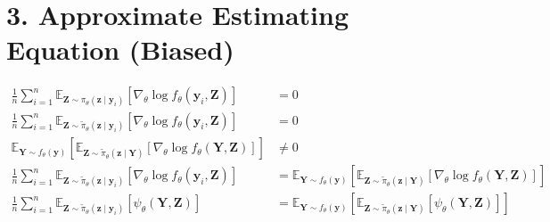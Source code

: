 \documentclass{article}
\begin{document}
\section*{3. Approximate Estimating Equation (Biased)}

\begin{align*}
\frac{1}{n} \sum_{i=1}^n 
\mathbb{E}_{\mathbf{Z} \sim \pi_\theta(\bm{z} \mid \bm{y}_i)} 
\left[
\nabla_\theta \log f_\theta(\bm{y}_i, \mathbf{Z})
\right] 
&= 0 \\
\frac{1}{n} \sum_{i=1}^n 
\mathbb{E}_{\mathbf{Z} \sim \tilde{\pi}_\theta(\bm{z} \mid \bm{y}_i)} 
\left[
\nabla_\theta \log f_\theta(\bm{y}_i, \mathbf{Z})
\right] 
&= 0 \\
\mathbb{E}_{\mathbf{Y} \sim f_\theta(\bm{y})}
\left[
\mathbb{E}_{\mathbf{Z} \sim \tilde{\pi}_\theta(\bm{z} \mid \mathbf{Y})} 
\left[
\nabla_\theta \log f_\theta(\mathbf{Y}, \mathbf{Z})
\right]
\right]
&\neq 0 \\
\frac{1}{n} \sum_{i=1}^n 
\mathbb{E}_{\mathbf{Z} \sim \tilde{\pi}_\theta(\bm{z} \mid \bm{y}_i)} 
\left[
\nabla_\theta \log f_\theta(\bm{y}_i, \mathbf{Z})
\right] 
&= 
\mathbb{E}_{\mathbf{Y} \sim f_\theta(\bm{y})}
\left[
\mathbb{E}_{\mathbf{Z} \sim \tilde{\pi}_\theta(\bm{z} \mid \mathbf{Y})} 
\left[
\nabla_\theta \log f_\theta(\mathbf{Y}, \mathbf{Z})
\right]
\right] \\
\frac{1}{n} \sum_{i=1}^n 
\mathbb{E}_{\mathbf{Z} \sim \tilde{\pi}_\theta(\bm{z} \mid \bm{y}_i)} 
\left[
\psi_\theta(\mathbf{Y}, \mathbf{Z})
\right] 
&=
\mathbb{E}_{\mathbf{Y} \sim f_\theta(\bm{y})}
\left[
\mathbb{E}_{\mathbf{Z} \sim \tilde{\pi}_\theta(\bm{z} \mid \mathbf{Y})} 
\left[
\psi_\theta(\mathbf{Y}, \mathbf{Z})
\right]
\right]
\end{align*}
\end{document}
